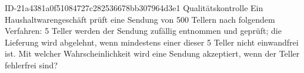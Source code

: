 \begin{exercise}
      {ID-21a4381a0f51084727c282536678bb307964d3e1}
      {Qualitätskontrolle}
  \ifproblem\problem
    Ein Haushaltwarengeschäft prüft eine Sendung von 500 Tellern nach
    folgendem Verfahren: 5 Teller werden der Sendung zufällig entnommen
    und geprüft; die Lieferung wird abgelehnt, wenn mindestens einer
    dieser 5 Teller nicht einwandfrei ist. Mit welcher Wahrscheinlichkeit
    wird eine Sendung akzeptiert, wenn  der Teller fehlerfrei sind?
  \fi
\end{exercise}
